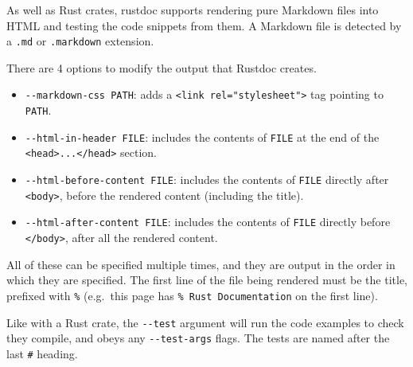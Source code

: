 \documentclass[]{article}
\begin{document}
As well as Rust crates, rustdoc supports rendering pure Markdown files
into HTML and testing the code snippets from them. A Markdown file is
detected by a \texttt{.md} or \texttt{.markdown} extension.

There are 4 options to modify the output that Rustdoc creates.

\begin{itemize}
\itemsep1pt\parskip0pt
\item
  \texttt{-\/-markdown-css PATH}: adds a
  \texttt{\textless{}link rel="stylesheet"\textgreater{}} tag pointing
  to \texttt{PATH}.
\item
  \texttt{-\/-html-in-header FILE}: includes the contents of
  \texttt{FILE} at the end of the
  \texttt{\textless{}head\textgreater{}...\textless{}/head\textgreater{}}
  section.
\item
  \texttt{-\/-html-before-content FILE}: includes the contents of
  \texttt{FILE} directly after \texttt{\textless{}body\textgreater{}},
  before the rendered content (including the title).
\item
  \texttt{-\/-html-after-content FILE}: includes the contents of
  \texttt{FILE} directly before \texttt{\textless{}/body\textgreater{}},
  after all the rendered content.
\end{itemize}

All of these can be specified multiple times, and they are output in the
order in which they are specified. The first line of the file being
rendered must be the title, prefixed with \texttt{\%} (e.g.~this page
has \texttt{\% Rust Documentation} on the first line).

Like with a Rust crate, the \texttt{-\/-test} argument will run the code
examples to check they compile, and obeys any \texttt{-\/-test-args}
flags. The tests are named after the last \texttt{\#} heading.
\end{document}
